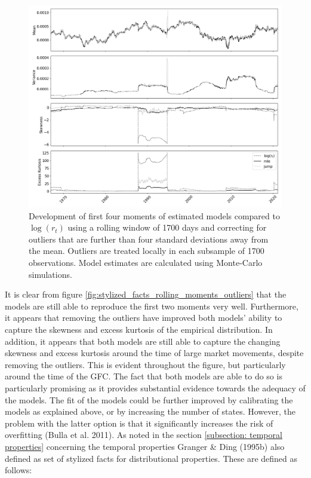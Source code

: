 \begin{figure}[H] 
    \centering
    \includegraphics[width=1.0\textwidth]{analysis/stylized_facts/images/rolling_moments.png}
    \caption{Development of first four moments of estimated models compared to $\log(r_t)$ using a rolling window of 1700 days and correcting for outliers that are further than four standard deviations away from the mean. Outliers are treated locally in each subsample of 1700 observations. Model estimates are calculated using Monte-Carlo simulations.}
    \label{fig:stylized_facts_rolling_moments_outliers_absolute} 
\end{figure}

It is clear from figure \ref{fig:stylized_facts_rolling_moments_outliers} that the models are still able to reproduce the first two moments very well. Furthermore, it appears that removing the outliers have improved both models' ability to capture the skewness and excess kurtosis of the empirical distribution. In addition, it appears that both models are still able to capture the changing skewness and excess kurtosis around the time of large market movements, despite removing the outliers. This is evident throughout the figure, but particularly around the time of the GFC. The fact that both models are able to do so is particularly promising as it provides substantial evidence towards the adequacy of the models. The fit of the models could be further improved by calibrating the models as explained above, or by increasing the number of states. However, the problem with the latter option is that it significantly increases the risk of overfitting (Bulla et al. 2011). As noted in the section \ref{subsection: temporal properties} concerning the temporal properties Granger \& Ding (1995b) also defined as set of stylized facts for distributional properties. These are defined as follows:

